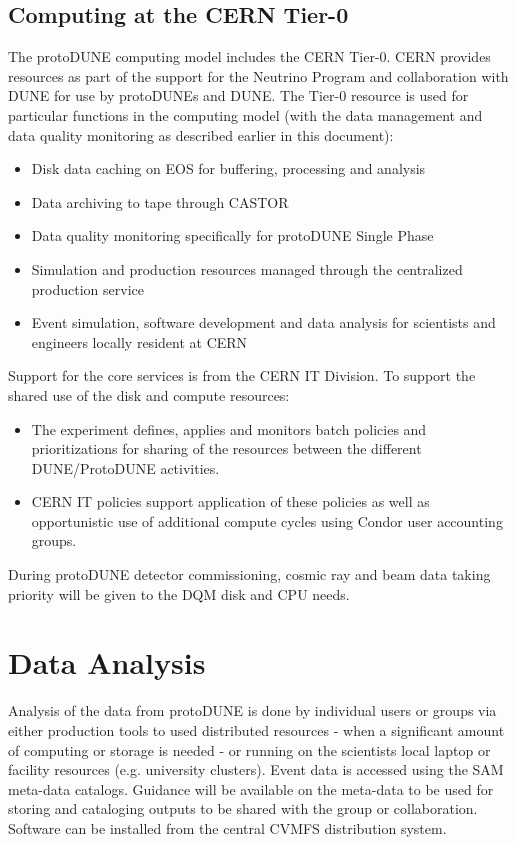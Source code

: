 \documentclass[12pt]{article}
\begin{document}
{\subsection{Computing at the CERN Tier-0}

The protoDUNE computing model includes the CERN Tier-0. CERN provides resources as part of the support for the Neutrino Program and collaboration with DUNE for use by protoDUNEs and DUNE. The Tier-0 resource is used for particular functions in the computing model (with the data management and data quality monitoring as described earlier in this document):
\begin{itemize}
\item Disk data caching on EOS for buffering, processing and analysis
\item Data archiving to tape through CASTOR
\item Data quality monitoring specifically for protoDUNE Single Phase  
\item Simulation and production resources managed through the centralized production service
\item Event simulation, software development and data analysis for scientists and engineers locally resident at CERN
\end{itemize}
Support for the core services is from the CERN IT Division.  To support the shared use of the disk and compute resources: 
\begin{itemize}
\item The experiment defines, applies and monitors batch policies and prioritizations for sharing of the resources between the different DUNE/ProtoDUNE activities. 
\item CERN IT policies support application of these policies as well as opportunistic use of additional compute cycles using Condor user accounting groups. 
\end{itemize}
During protoDUNE detector commissioning, cosmic ray and beam data taking priority will be given to the DQM disk and CPU needs.  

\section{Data Analysis}
Analysis of the data from protoDUNE is done by individual users or groups via either production tools to used distributed resources - when a significant amount of computing or storage is needed - or running on the scientists local laptop or facility resources (e.g. university clusters). Event data is accessed using the SAM meta-data catalogs. Guidance will be available on the meta-data to be used for storing and cataloging outputs to be shared with the group or collaboration. Software can be installed from the central CVMFS distribution system.  

}
\end{document}

